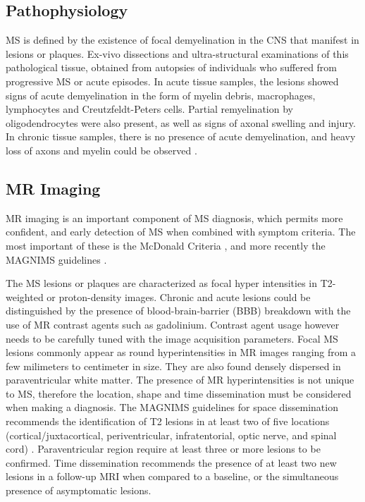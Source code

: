 \subsection{Pathophysiology}

MS is defined by the existence of focal demyelination in the CNS that manifest in lesions or plaques. Ex-vivo dissections and ultra-structural examinations of this pathological tissue, obtained from autopsies of individuals who suffered from progressive MS or acute episodes. In acute tissue samples, the lesions showed signs of acute demyelination in the form of myelin debris, macrophages, lymphocytes and Creutzfeldt-Peters cells. Partial remyelination by oligodendrocytes were also present, as well as signs of axonal swelling and injury. In chronic tissue samples, there is no presence of acute demyelination, and heavy loss of axons and myelin could be observed \cite{Filippi2012}. 

\subsection{MR Imaging}

MR imaging is an important component of MS diagnosis, which permits more confident, and early detection of MS when combined with symptom criteria. The most important of these is the McDonald Criteria \cite{Polman2011}, and more recently the MAGNIMS guidelines \cite{Filippi2016}. 

The MS lesions or plaques are characterized as focal hyper intensities in T2-weighted or proton-density images. Chronic and acute lesions could be distinguished by the presence of blood-brain-barrier (BBB) breakdown with the use of MR contrast agents such as gadolinium. Contrast agent usage however needs to be carefully tuned with the image acquisition parameters.
Focal MS lesions commonly appear as round hyperintensities in MR images ranging from a few milimeters to centimeter in size. They are also found densely dispersed in paraventricular white matter. The presence of MR hyperintensities is not unique to MS, therefore the location, shape and time dissemination must be considered when making a diagnosis. The MAGNIMS guidelines for space dissemination recommends the identification of T2 lesions in at least two of five locations (cortical/juxtacortical, periventricular, infratentorial, optic nerve, and spinal cord) \cite{Filippi2016}. Paraventricular region require at least three or more lesions to be confirmed. Time dissemination recommends the presence of at least two new lesions in a follow-up MRI when compared to a baseline, or the simultaneous presence of asymptomatic lesions. 

